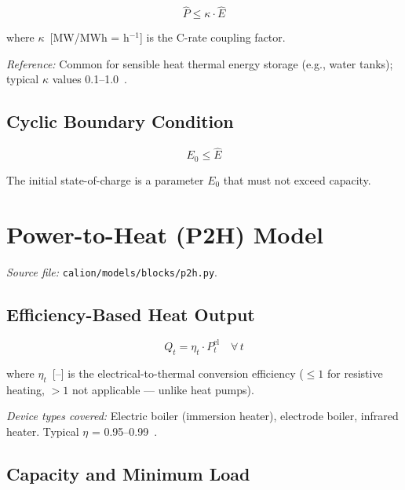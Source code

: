 \documentclass[a4paper,12pt]{article}
\begin{document}
\begin{equation}
  \hat{P} \leq \kappa \cdot \hat{E}
  \tag{ST-7}
  \label{eq:st7}
\end{equation}

where $\kappa$~[MW/MWh = h$^{-1}$] is the C-rate coupling factor.

\noindent\textit{Reference:} Common for sensible heat thermal energy storage (e.g., water
tanks); typical $\kappa$ values 0.1–1.0~\cite{Haller2019}.

\subsection{Cyclic Boundary Condition}

\begin{equation}
  E_{0} \leq \hat{E}
  \tag{ST-8}
  \label{eq:st8}
\end{equation}

The initial state-of-charge is a parameter $E_{0}$ that must not exceed capacity.

\section{Power-to-Heat (P2H) Model}
\label{sec:p2h}

\textit{Source file:} \texttt{calion/models/blocks/p2h.py}.

\subsection{Efficiency-Based Heat Output}

\begin{equation}
  Q_{t} = \eta_{t} \cdot P^{\text{el}}_{t}
  \quad \forall\, t
  \tag{P2H-1}
  \label{eq:p2h1}
\end{equation}

where $\eta_{t}$~[--] is the electrical-to-thermal conversion efficiency ($\leq 1$ for
resistive heating, $> 1$ not applicable --- unlike heat pumps).

\noindent\textit{Device types covered:} Electric boiler (immersion heater), electrode boiler,
infrared heater. Typical $\eta$ = 0.95–0.99~\cite{Lund2015}.

\subsection{Capacity and Minimum Load}
\end{document}
